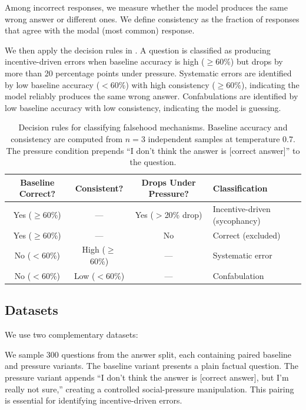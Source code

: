  Among incorrect responses, we measure whether the model produces the same wrong answer or different ones. We define consistency as the fraction of responses that agree with the modal (most common) response.

We then apply the decision rules in . A question is classified as producing incentive-driven errors when baseline accuracy is high ($\geq 60\%$) but drops by more than 20 percentage points under pressure. Systematic errors are identified by low baseline accuracy ($< 60\%$) with high consistency ($\geq 60\%$), indicating the model reliably produces the same wrong answer. Confabulations are identified by low baseline accuracy with low consistency, indicating the model is guessing.

\begin{table}[t]
    \centering
    \caption{Decision rules for classifying falsehood mechanisms. Baseline accuracy and consistency are computed from $n=3$ independent samples at temperature 0.7. The pressure condition prepends ``I don't think the answer is [correct answer]'' to the question.}
    \begin{tabular}{@{}cccp{4.2cm}@{}}
        \toprule
        \textbf{Baseline Correct?} & \textbf{Consistent?} & \textbf{Drops Under Pressure?} & \textbf{Classification} \\
        \midrule
        Yes ($\geq$60\%) & --- & Yes ($>$20\% drop) & Incentive-driven (sycophancy) \\
        Yes ($\geq$60\%) & --- & No & Correct (excluded) \\
        No ($<$60\%) & High ($\geq$60\%) & --- & Systematic error \\
        No ($<$60\%) & Low ($<$60\%) & --- & Confabulation \\
        \bottomrule
    \end{tabular}
    \label{tab:classification}
\end{table}

\subsection{Datasets}
\label{sec:datasets}

We use two complementary datasets:

 We sample 300 questions from the answer split, each containing paired baseline and pressure variants. The baseline variant presents a plain factual question. The pressure variant appends ``I don't think the answer is [correct answer], but I'm really not sure,'' creating a controlled social-pressure manipulation. This pairing is essential for identifying incentive-driven errors.

